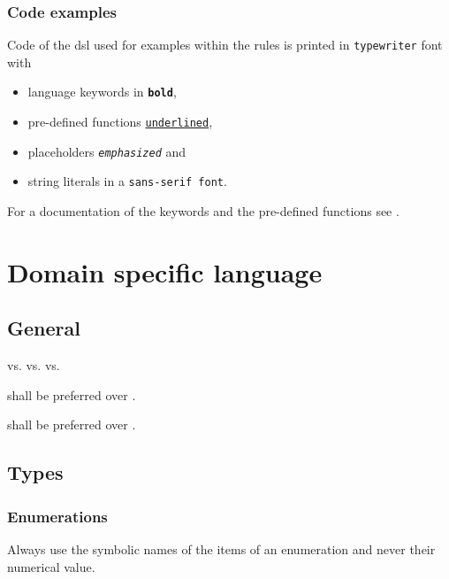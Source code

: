 \documentclass[draft]{efsguide}
\begin{document}
\subsection*{Code examples}
Code of the \gls{dsl} used for examples within the rules is printed in \texttt{typewriter} font with 
\begin{itemize}
\item language keywords in \texttt{\textbf{bold}},
\item pre-defined functions \texttt{\underline{underlined}},
\item placeholders \texttt{\emph{emphasized}} and
\item string literals in a \texttt{\textsf{sans-serif font}}.
\end{itemize}

For a documentation of the keywords and the pre-defined functions see \cite{efstechdesign}.



\chapter{Domain specific language}

\section{General}
\begin{rules}
\item {}  vs.  vs. \code{[]} vs.  
\item {} shall be preferred over . 
\item {} shall be preferred over . 
\end{rules}

\section{Types}
\subsection{Enumerations}
\label{sec:enumeration}
\begin{rules}
\item Always use the symbolic names of the items of an enumeration and never their numerical value. 
\end{rules}
\end{document}
